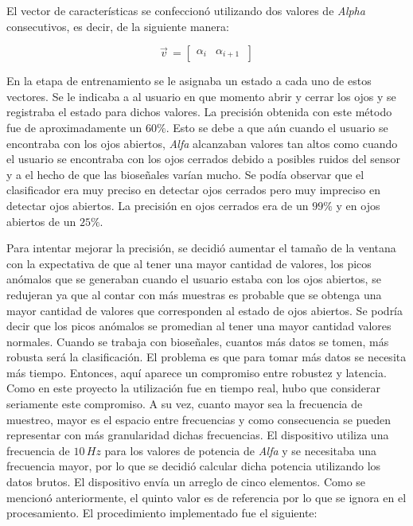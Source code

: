 El vector de características se confeccionó utilizando dos valores de \emph{Alpha} consecutivos, es decir, de la siguiente manera:

\[
  \vec{v}^{\, }=
  \left[ {\begin{array}{cc}
   \alpha_{i}  & \alpha_{i + 1}  \     \end{array} } \right]
\]

En la etapa de entrenamiento se le asignaba un estado a cada uno de estos vectores. Se le indicaba a al usuario en que momento abrir y cerrar los ojos y se registraba el estado para dichos valores. La precisión obtenida con este método fue de aproximadamente un $60\%$. Esto se debe a que aún cuando el usuario se encontraba con los ojos abiertos, \emph{Alfa} alcanzaban valores tan altos como cuando el usuario se encontraba con los ojos cerrados debido a posibles ruidos del sensor y a el hecho de que las bioseñales varían mucho. Se podía observar que el clasificador era muy preciso en detectar ojos cerrados pero muy impreciso en detectar ojos abiertos. La precisión en ojos cerrados era de un $99\%$ y en ojos abiertos de un $25\%$.

Para intentar mejorar la precisión, se decidió aumentar el tamaño de la ventana con la expectativa de que al tener una mayor cantidad de valores, los picos anómalos que se generaban cuando el usuario estaba con los ojos abiertos, se redujeran ya que al contar con más muestras es probable que se obtenga una mayor cantidad de valores que corresponden al estado de ojos abiertos. Se podría decir que los picos anómalos se promedian al tener una mayor cantidad valores normales. Cuando se trabaja con bioseñales, cuantos más datos se tomen, más robusta será la clasificación. El problema es que para tomar más datos se necesita más tiempo. Entonces, aquí aparece un compromiso entre robustez y latencia. Como en este proyecto la utilización fue en tiempo real, hubo que considerar seriamente este compromiso. A su vez, cuanto mayor sea la frecuencia de muestreo, mayor es el espacio entre frecuencias y como consecuencia se pueden representar con más granularidad dichas frecuencias. El dispositivo utiliza una frecuencia de $10 \, Hz$ para los valores de potencia de \emph{Alfa} y se necesitaba una frecuencia mayor, por lo que se decidió calcular dicha potencia utilizando los datos brutos. El dispositivo envía un arreglo de cinco elementos. Como se mencionó anteriormente, el quinto valor es de referencia por lo que se ignora en el procesamiento. El procedimiento implementado fue el siguiente:

